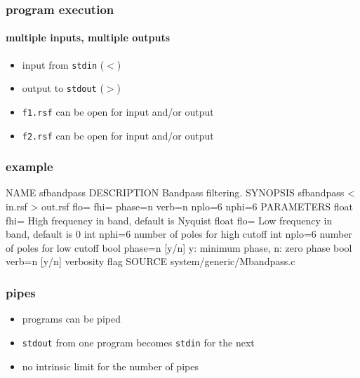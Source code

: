 \begin{frame} \frametitle{program execution}
  \framesubtitle{multiple inputs, multiple outputs}
  

  \begin{itemize}
  \item input from \texttt{stdin} ($<$)
  \item output to \texttt{stdout} ($>$)
  \item \texttt{f1.rsf} can be open for input and/or output
  \item \texttt{f2.rsf} can be open for input and/or output
  \end{itemize}
  
\end{frame}
\cwpnote{}

\begin{frame}[fragile] \frametitle{example}


\tiny
\begin{semiverbatim}
NAME
        sfbandpass
DESCRIPTION
        Bandpass filtering. 
SYNOPSIS
        sfbandpass < in.rsf > out.rsf flo= fhi= phase=n verb=n nplo=6 nphi=6
PARAMETERS
        float   fhi=    High frequency in band, default is Nyquist 
        float   flo=    Low frequency in band, default is 0 
        int     nphi=6  number of poles for high cutoff 
        int     nplo=6  number of poles for low cutoff 
        bool    phase=n [y/n]   y: minimum phase, n: zero phase 
        bool    verb=n [y/n]    verbosity flag
SOURCE
        system/generic/Mbandpass.c
\end{semiverbatim}
\end{frame}
\cwpnote{}

\begin{frame} \frametitle{pipes}

  \begin{itemize}
  \item \mg programs can be piped
  \item \texttt{stdout} from one program becomes \texttt{stdin} for the next
  \item no intrinsic limit for the number of pipes
  \end{itemize}
  
\end{frame}
\cwpnote{}


